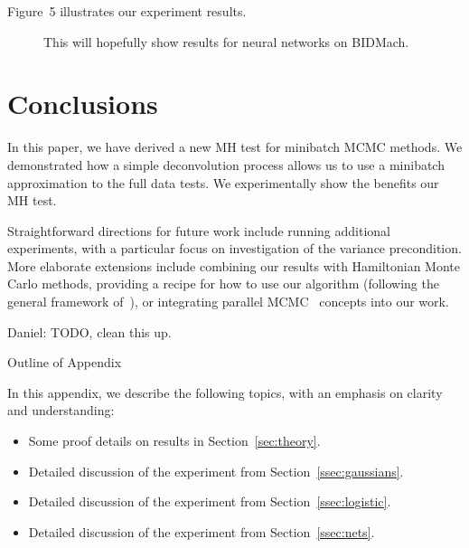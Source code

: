 \documentclass{article}
\begin{document}
Figure~5 illustrates our experiment results.  
\begin{figure}[t]
    \centering
    \fbox{\rule[-.5cm]{0cm}{4cm} \rule[-.5cm]{4cm}{0cm}}
    \caption{This will hopefully show results for neural networks on BIDMach.}
\end{figure}




\section{Conclusions}\label{sec:conclusion}

In this paper, we have derived a new MH test for minibatch MCMC methods. We demonstrated how a
simple deconvolution process allows us to use a minibatch approximation to the full data tests. We
experimentally show the benefits our MH test.

Straightforward directions for future work include running additional experiments, with a particular
focus on investigation of the variance precondition.  More elaborate extensions include combining
our results with Hamiltonian Monte Carlo methods, providing a recipe for how to use our algorithm
(following the general framework of~\cite{sgmcmc_2015}), or integrating parallel
MCMC~\cite{conf/uai/AngelinoKWSA14,conf/icml/AhnSW14} concepts into our work.

{\color{blue}
Daniel: TODO, clean this up.
}

\small


\normalsize

\clearpage
\appendix

\begin{center}
{\Large Outline of Appendix}
\end{center}

In this appendix, we describe the following topics, with an emphasis on clarity and understanding:

\begin{itemize}[noitemsep]
    \item Some proof details on results in Section~\ref{sec:theory}.
    \item Detailed discussion of the experiment from Section~\ref{ssec:gaussians}.
    \item Detailed discussion of the experiment from Section~\ref{ssec:logistic}.
    \item Detailed discussion of the experiment from Section~\ref{ssec:nets}.
\end{itemize}
\end{document}
